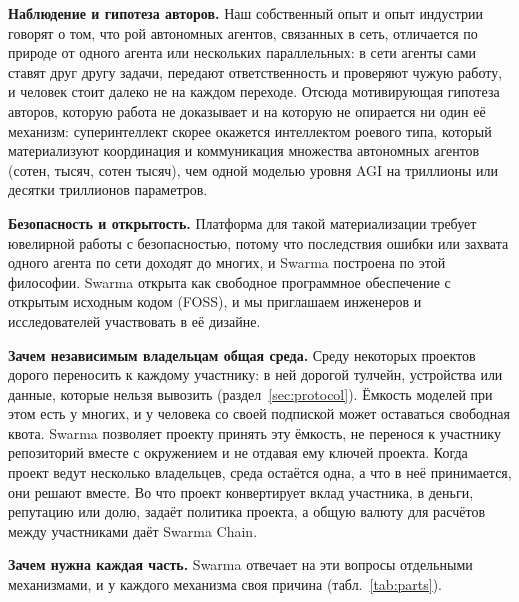 \documentclass[10pt,a4paper]{article}
\begin{document}
\textbf{Наблюдение и гипотеза авторов.} Наш собственный опыт и опыт индустрии говорят о том, что рой автономных агентов, связанных в сеть, отличается по природе от одного агента или нескольких параллельных: в сети агенты сами ставят друг другу задачи, передают ответственность и проверяют чужую работу, и человек стоит далеко не на каждом переходе. Отсюда мотивирующая гипотеза авторов, которую работа не доказывает и на которую не опирается ни один её механизм: суперинтеллект скорее окажется интеллектом роевого типа, который материализуют координация и коммуникация множества автономных агентов (сотен, тысяч, сотен тысяч), чем одной моделью уровня AGI на триллионы или десятки триллионов параметров.

\textbf{Безопасность и открытость.} Платформа для такой материализации требует ювелирной работы с безопасностью, потому что последствия ошибки или захвата одного агента по сети доходят до многих, и Swarma построена по этой философии. Swarma открыта как свободное программное обеспечение с открытым исходным кодом (FOSS), и мы приглашаем инженеров и исследователей участвовать в её дизайне.

\textbf{Зачем независимым владельцам общая среда.} Среду некоторых проектов дорого переносить к каждому участнику: в ней дорогой тулчейн, устройства или данные, которые нельзя вывозить (раздел~\ref{sec:protocol}). Ёмкость моделей при этом есть у многих, и у человека со своей подпиской может оставаться свободная квота. Swarma позволяет проекту принять эту ёмкость, не перенося к участнику репозиторий вместе с окружением и не отдавая ему ключей проекта. Когда проект ведут несколько владельцев, среда остаётся одна, а что в неё принимается, они решают вместе. Во что проект конвертирует вклад участника, в деньги, репутацию или долю, задаёт политика проекта, а общую валюту для расчётов между участниками даёт Swarma Chain.

\textbf{Зачем нужна каждая часть.} Swarma отвечает на эти вопросы отдельными механизмами, и у каждого механизма своя причина (табл.~\ref{tab:parts}).
\end{document}
